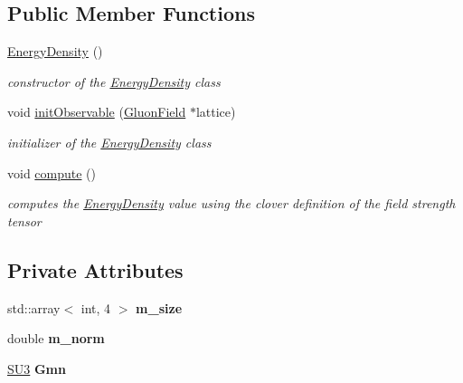 \subsection*{Public Member Functions}
\begin{DoxyCompactItemize}
\item 
\hyperlink{classEnergyDensity_ac48448e9e6095b0bc817942dc4de411d}{Energy\+Density} ()\hypertarget{classEnergyDensity_ac48448e9e6095b0bc817942dc4de411d}{}\label{classEnergyDensity_ac48448e9e6095b0bc817942dc4de411d}

\begin{DoxyCompactList}\small\item\em constructor of the \hyperlink{classEnergyDensity}{Energy\+Density} class \end{DoxyCompactList}\item 
void \hyperlink{classEnergyDensity_ad076c85838b7d1e4d795655818369409}{init\+Observable} (\hyperlink{field_8h_afe80b127697eba6d6e7fbd8121c8d4ee}{Gluon\+Field} $\ast$lattice)\hypertarget{classEnergyDensity_ad076c85838b7d1e4d795655818369409}{}\label{classEnergyDensity_ad076c85838b7d1e4d795655818369409}

\begin{DoxyCompactList}\small\item\em initializer of the \hyperlink{classEnergyDensity}{Energy\+Density} class \end{DoxyCompactList}\item 
void \hyperlink{classEnergyDensity_a8719af212e9534be4f23244c0ea85019}{compute} ()\hypertarget{classEnergyDensity_a8719af212e9534be4f23244c0ea85019}{}\label{classEnergyDensity_a8719af212e9534be4f23244c0ea85019}

\begin{DoxyCompactList}\small\item\em computes the \hyperlink{classEnergyDensity}{Energy\+Density} value using the clover definition of the field strength tensor \end{DoxyCompactList}\end{DoxyCompactItemize}
\subsection*{Private Attributes}
\begin{DoxyCompactItemize}
\item 
std\+::array$<$ int, 4 $>$ {\bfseries m\+\_\+size}\hypertarget{classEnergyDensity_a86486c6e6f1f4a0db45e33fe17c3eb84}{}\label{classEnergyDensity_a86486c6e6f1f4a0db45e33fe17c3eb84}

\item 
double {\bfseries m\+\_\+norm}\hypertarget{classEnergyDensity_a62b537a325d00c79646876d9178ddc22}{}\label{classEnergyDensity_a62b537a325d00c79646876d9178ddc22}

\item 
\hyperlink{structSU3}{S\+U3} {\bfseries Gmn}\hypertarget{classEnergyDensity_a7beebd4229b64e2829a4bf7fa708845f}{}\label{classEnergyDensity_a7beebd4229b64e2829a4bf7fa708845f}

\end{DoxyCompactItemize}
